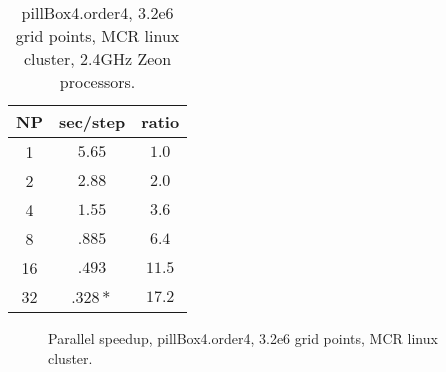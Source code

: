 \documentclass[12pt]{article}
\begin{document}
\begin{table}[hbt]
\begin{center}\footnotesize
\begin{tabular}{|c|c|c|} \hline 
     NP       & sec/step   & ratio \\   \hline\hline 
     1        &  $5.65$    & $ 1.0 $   \\ 
     2        &  $2.88$    & $ 2.0 $   \\ 
     4        &  $1.55$    & $ 3.6 $   \\ 
     8        &  $.885$    & $ 6.4 $   \\ 
    16        &  $.493$    & $11.5 $   \\ 
    32        &  $.328*$   & $17.2 $   \\ \hline 
\end{tabular}		
\end{center}		
\caption{pillBox4.order4, 3.2e6 grid points, MCR linux cluster, 2.4GHz Zeon processors.}
 \label{tab:box} 
\end{table}

\begin{figure}
\begin{center}
\end{center}
\caption{Parallel speedup, pillBox4.order4, 3.2e6 grid points, MCR linux cluster.}
\end{figure}
\end{document}

